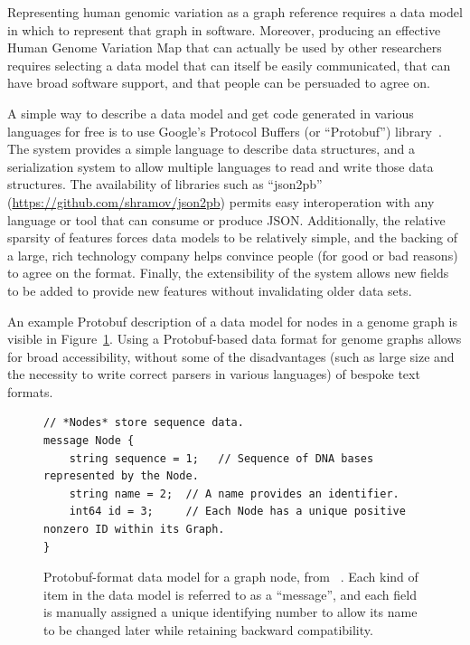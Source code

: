 Representing human genomic variation as a graph reference requires a data model in which to represent that graph in software. Moreover, producing an effective Human Genome Variation Map that can actually be used by other researchers requires selecting a data model that can itself be easily communicated, that can have broad software support, and that people can be persuaded to agree on.

A simple way to describe a data model and get code generated in various languages for free is to use Google's Protocol Buffers (or ``Protobuf'') library~\cite{varda2008protocol}. The system provides a simple language to describe data structures, and a serialization system to allow multiple languages to read and write those data structures. The availability of libraries such as ``json2pb'' (\url{https://github.com/shramov/json2pb}) permits easy interoperation with any language or tool that can consume or produce JSON. Additionally, the relative sparsity of features forces data models to be relatively simple, and the backing of a large, rich technology company helps convince people (for good or bad reasons) to agree on the format. Finally, the extensibility of the system allows new fields to be added to provide new features without invalidating older data sets.

An example Protobuf description of a data model for nodes in a genome graph is visible in Figure~\ref{fig:protobuf}. Using a Protobuf-based data format for genome graphs allows for broad accessibility, without some of the disadvantages (such as large size and the necessity to write correct parsers in various languages) of bespoke text formats. 

\begin{figure}[ht]
\begin{lstlisting}
// *Nodes* store sequence data.
message Node {
    string sequence = 1;   // Sequence of DNA bases represented by the Node.
    string name = 2;  // A name provides an identifier.
    int64 id = 3;     // Each Node has a unique positive nonzero ID within its Graph.
}
\end{lstlisting}
\caption[Graph node data model]{Protobuf-format data model for a graph node, from \vg ~\cite{garrison2016vg}. Each kind of item in the data model is referred to as a ``message'', and each field is manually assigned a unique identifying number to allow its name to be changed later while retaining backward compatibility.}
\label{fig:protobuf}
\end{figure}

